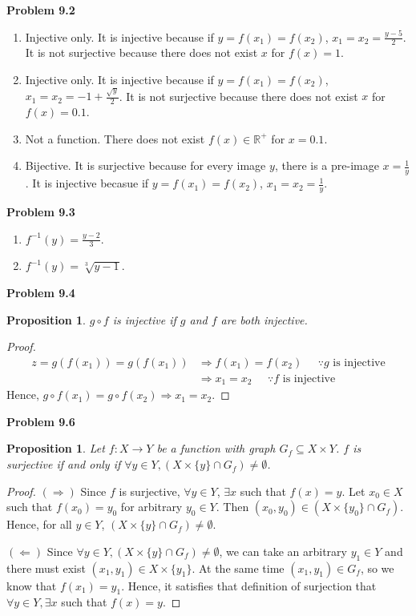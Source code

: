 \documentclass{article}
\newtheorem{prop}[thm]{Proposition}
\begin{document}
\textbf{Problem 9.2}
\begin{enumerate}[label={(\roman*)}]
    \item Injective only. It is injective because if $y=f(x_1)=f(x_2)$, $x_1=x_2=\frac{y-5}{2}$. It is not surjective because there does not exist $x$ for $f(x) = 1$.
    \item Injective only. It is injective because if $y=f(x_1)=f(x_2)$, $x_1=x_2=-1+\frac{\sqrt{y}}{2}$. It is not surjective because there does not exist $x$ for $f(x) = 0.1$.
    \item Not a function. There does not exist $f(x) \in \mathbb{R}^+$ for $x=0.1$.
    \item Bijective. It is surjective because for every image $y$, there is a pre-image $x=\frac{1}{y}$. It is injective becasue if $y =f(x_1)=f(x_2)$, $x_1=x_2=\frac{1}{y}$.
\end{enumerate}
\bigbreak

\textbf{Problem 9.3}
\begin{enumerate}[label={(\roman*)}]
    \item $f^{-1}(y)=\frac{y-2}{3}$.
    \item $f^{-1}(y)=\sqrt[3]{y-1}$.
\end{enumerate}
\bigbreak

\textbf{Problem 9.4}
\begin{prop}
    $g\circ f$ is injective if $g$ and $f$ are both injective.
\end{prop}
\begin{proof}
    \begin{align}
        z = g(f(x_1)) = g(f(x_1)) & \Rightarrow f(x_1) = f(x_2) \;\;\;\;\; \because g \text{ is injective} \\
        & \Rightarrow x_1 = x_2 \;\;\;\;\; \because f \text{ is injective}
    \end{align}
    Hence, $g\circ f(x_1)=g\circ f(x_2)\Rightarrow x_1 = x_2$.
\end{proof}
\bigbreak

\textbf{Problem 9.6}
\begin{prop}
    Let $f:X\rightarrow Y$ be a function with graph $G_f \subseteq X\times Y$. $f$ is surjective if and only if $\forall y \in Y, (X\times \{y\}\cap G_f)\neq \emptyset$.
\end{prop}
\begin{proof}
    $(\Rightarrow)$ Since $f$ is surjective, $\forall y \in Y$, $\exists x$ such that $f(x)=y$. 
    Let $x_0 \in X$ such that $f(x_0)=y_0$ for arbitrary $y_0\in Y$.
    Then $(x_0,y_0) \in (X \times \{y_0\}\cap G_f)$. Hence, for all $y\in Y$, $(X \times \{y\}\cap G_f)\neq \emptyset$.
    
    $(\Leftarrow)$ Since $\forall y \in Y, (X\times \{y\}\cap G_f)\neq \emptyset$, we can take an arbitrary $y_1 \in Y$ and there must exist $(x_1,y_1) \in X\times \{y_1\}$.
    At the same time $(x_1,y_1)\in G_f$, so we know that $f(x_1)=y_1$. 
    Hence, it satisfies that definition of surjection that $\forall y \in Y, \exists x$ such that $f(x)=y$.
\end{proof}
\bigbreak
\end{document}
